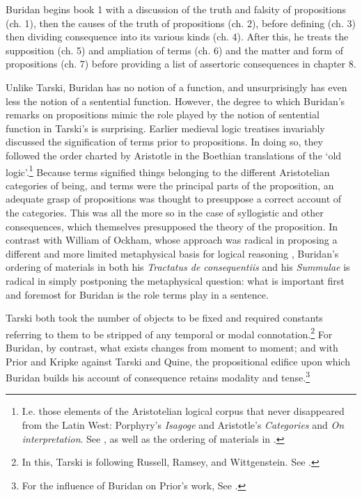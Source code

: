 \documentclass[]{article}
\begin{document}
Buridan begins book 1 with a discussion of the truth and falsity of propositions (ch. 1), then the causes of the truth of propositions (ch. 2), before defining (ch. 3) then dividing consequence into its various kinds (ch. 4). After this, he treats the supposition (ch. 5) and ampliation of terms (ch. 6) and the matter and form of propositions (ch. 7) before providing a list of assertoric consequences in chapter 8.

Unlike Tarski, Buridan has no notion of a function, and unsurprisingly has even less the notion of a sentential function. However, the degree to which Buridan's remarks on propositions mimic the role played by the notion of sentential function in Tarski's is surprising. Earlier medieval logic treatises invariably discussed the signification of terms prior to propositions. In doing so, they followed the order charted by Aristotle in the Boethian translations of the `old logic'.\footnote{I.e. those elements of the Aristotelian logical corpus that never disappeared from the Latin West: Porphyry's \textit{Isagoge} and Aristotle's \textit{Categories} and \textit{On interpretation}. See \autocite[prologue]{AquinasDI}, as well as the ordering of materials in \autocite{OckhamSL}.} Because terms signified things belonging to the different Aristotelian categories of being, and terms were the principal parts of the proposition, an adequate grasp of propositions was thought to presuppose a correct account of the categories. This was all the more so in the case of syllogistic and other consequences, which themselves presupposed the theory of the proposition. In contrast with William of Ockham, whose approach was radical in proposing a different and more limited metaphysical basis for logical reasoning \autocite{Read2007}, Buridan's ordering of materials in both his \textit{Tractatus de consequentiis} and his \textit{Summulae} is radical in simply postponing the metaphysical question: what is important first and foremost for Buridan is the role terms play in a sentence.

Tarski both took the number of objects to be fixed and required constants referring to them to be stripped of any temporal or modal connotation.\footnote{In this, Tarski is following Russell, Ramsey, and Wittgenstein. See \autocite[59ff]{Ramsey1931}.} For Buridan, by contrast, what exists changes from moment to moment; and with Prior and Kripke against Tarski and Quine, the propositional edifice upon which Buridan builds his account of consequence retains modality and tense.\footnote{For the influence of Buridan on Prior's work, See \autocite{Uckelman2012b}.}
\end{document}
